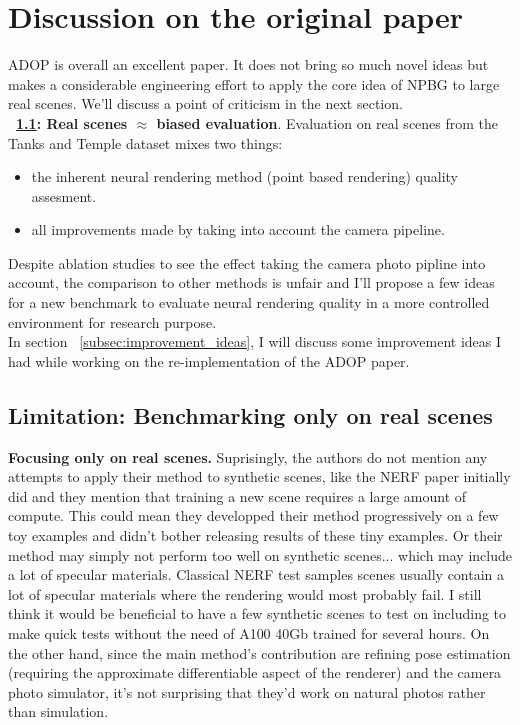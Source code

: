 \section{Discussion on the original paper}
\label{sec:discussion}
ADOP\cite{ruckert2022adop} is overall an excellent paper. It does not bring so much novel ideas but makes a considerable engineering effort to apply the core idea of NPBG \cite{Aliev2020} to large real scenes.
We'll discuss a point of criticism in the next section.\\
\noindent \textbf{~\ref{subsec:limits_real_scenes}{: Real scenes $\approx$ biased evaluation}}. Evaluation on real scenes from the Tanks and Temple dataset \cite{Knapitsch2017TanksAndTemples} mixes two things:
\begin{itemize}
    \item the inherent neural rendering method (point based rendering) quality assesment.
    \item all improvements made by taking into account the camera pipeline.
\end{itemize}
Despite ablation studies to see the effect taking the camera photo pipline into account, the comparison to other methods is unfair and I'll propose a few ideas for a new benchmark to evaluate neural rendering quality in a more controlled environment for research purpose.\\
In section ~\ref{subsec:improvement_ideas}, I will discuss some improvement ideas I had while working on the re-implementation of the ADOP paper.



\subsection{Limitation: Benchmarking only on real scenes}
\label{subsec:limits_real_scenes}
\noindent \textbf{Focusing only on real scenes.}
Suprisingly, the authors do not mention any attempts to apply their method to synthetic scenes, like the NERF paper initially did and they mention that training a new scene requires a large amount of compute. This could mean they developped their method progressively on a few toy examples and didn't bother releasing results of these tiny examples. Or their method may simply not perform too well on synthetic scenes... which may include a lot of specular materials. Classical NERF test samples scenes usually contain a lot of specular materials where the rendering would most probably fail. I still think it would be beneficial to have a few synthetic scenes to test on including to make quick tests without the need of A100 40Gb trained for several hours.
On the other hand, since the main method's contribution are refining pose estimation (requiring the approximate differentiable aspect of the renderer) and the camera photo simulator, it's not surprising that they'd work on natural photos rather than simulation. 

